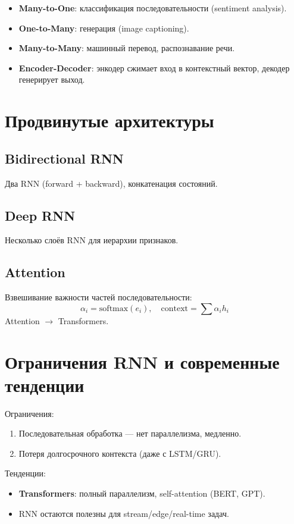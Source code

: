 \documentclass[a4paper,12pt]{article}
\begin{document}
\begin{itemize}
    \item \textbf{Many-to-One}: классификация последовательности (sentiment analysis).
    \item \textbf{One-to-Many}: генерация (image captioning).
    \item \textbf{Many-to-Many}: машинный перевод, распознавание речи.
    \item \textbf{Encoder-Decoder}: энкодер сжимает вход в контекстный вектор, декодер генерирует выход.
\end{itemize}

\section{Продвинутые архитектуры}

\subsection{Bidirectional RNN}
Два RNN (forward + backward), конкатенация состояний.

\subsection{Deep RNN}
Несколько слоёв RNN для иерархии признаков.

\subsection{Attention}
Взвешивание важности частей последовательности:
\[
\alpha_i = \text{softmax}(e_i), \quad \text{context} = \sum \alpha_i h_i
\]
Attention $\to$ Transformers.

\section{Ограничения RNN и современные тенденции}

Ограничения:
\begin{enumerate}
    \item Последовательная обработка — нет параллелизма, медленно.
    \item Потеря долгосрочного контекста (даже с LSTM/GRU).
\end{enumerate}
Тенденции:
\begin{itemize}
    \item \textbf{Transformers}: полный параллелизм, self-attention (BERT, GPT).
    \item RNN остаются полезны для stream/edge/real-time задач.
\end{itemize}
\end{document}

